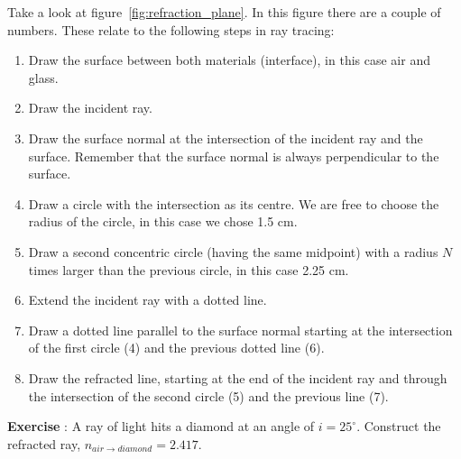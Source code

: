 \documentclass[12pt,a4paper]{article}
\numberwithin{equation}{section}
\numberwithin{figure}{section}
\newcounter{Exercise}
\numberwithin{table}{section}
\begin{document}
Take a look at figure~\ref{fig:refraction_plane}. In this figure there are a couple of numbers. These relate to the following steps in ray tracing:
\begin{enumerate}[1.]
\item Draw the surface between both materials (interface), in this case air and glass.
\item Draw the incident ray.
\item Draw the surface normal at the intersection of the incident ray and the surface. Remember that the surface normal is always perpendicular to the surface.
\item Draw a circle with the intersection as its centre. We are free to choose the radius of the circle, in this case we chose 1.5 cm.
\item Draw a second concentric circle (having the same midpoint) with a radius $N$ times larger than the previous circle, in this case 2.25 cm.
\item Extend the incident ray with a dotted line.
\item Draw a dotted line parallel to the surface normal starting at the intersection of the first circle (4) and the previous dotted line (6).
\item Draw the refracted line, starting at the end of the incident ray and through the intersection of the second circle (5) and the previous line (7).
\end{enumerate}

\begin{shaded}
\textbf{Exercise \theExercise {}} : A ray of light hits a diamond at an angle of $i=25^{\circ}$. Construct the refracted ray, $n_{air \rightarrow diamond} = 2.417.$\end{shaded}
\end{document}

